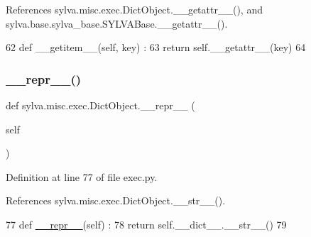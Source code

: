 References sylva.\+misc.\+exec.\+Dict\+Object.\+\_\+\+\_\+getattr\+\_\+\+\_\+(), and sylva.\+base.\+sylva\+\_\+base.\+S\+Y\+L\+V\+A\+Base.\+\_\+\+\_\+getattr\+\_\+\+\_\+().


\begin{DoxyCode}
62   \textcolor{keyword}{def }\_\_getitem\_\_(self, key) :
63     \textcolor{keywordflow}{return} self.\_\_getattr\_\_(key)
64 
\end{DoxyCode}
\mbox{\label{classsylva_1_1misc_1_1exec_1_1_dict_object_a50fd48db155e090c3fb26a50e2999a95}} 
\subsubsection{\texorpdfstring{\+\_\+\+\_\+repr\+\_\+\+\_\+()}{\_\_repr\_\_()}}
{\footnotesize\ttfamily def sylva.\+misc.\+exec.\+Dict\+Object.\+\_\+\+\_\+repr\+\_\+\+\_\+ (\begin{DoxyParamCaption}\item[{}]{self }\end{DoxyParamCaption})}



Definition at line 77 of file exec.\+py.



References sylva.\+misc.\+exec.\+Dict\+Object.\+\_\+\+\_\+str\+\_\+\+\_\+().


\begin{DoxyCode}
77   \textcolor{keyword}{def }\hyperlink{namespacesylva_1_1code__generation_1_1floorplanner_a84f24b1e40f5425e9bb40ab45ccbd10f}{\_\_repr\_\_}(self) :
78     \textcolor{keywordflow}{return} self.\_\_dict\_\_.\_\_str\_\_()
79 
\end{DoxyCode}
\mbox{\label{classsylva_1_1misc_1_1exec_1_1_dict_object_a219a0c8ab7c1f0a05a76c5c79f86fe59}} 
